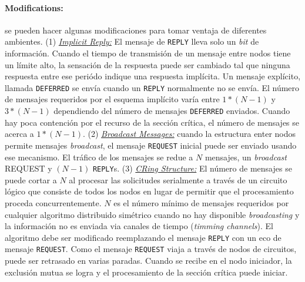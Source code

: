 \paragraph{\textnormal{\textbf{Modifications:}}}
se pueden hacer algunas modificaciones para tomar ventaja de diferentes ambientes. (1) \underline{\emph{Implicit Reply:}} El mensaje de \texttt{REPLY} lleva solo un \emph{bit} de información. Cuando el tiempo de transmisión de un mensaje entre nodos tiene un límite alto, la sensación de la respuesta puede ser cambiado tal que ninguna respuesta entre ese periódo indique una respuesta implícita. Un mensaje explícito, llamada \texttt{DEFERRED} se envía cuando un \texttt{REPLY} normalmente no se envía. El número de mensajes requeridos por el esquema implícito varía entre $1 * (N - 1)$ y $3 * (N - 1)$ dependiendo del número de mensajes \texttt{DEFERRED} enviados. Cuando hay poca contención por el recurso de la sección crítica, el número de mensajes se acerca a $1 * (N - 1)$. (2) \underline{\emph{Broadcast Messages:}} cuando la estructura enter nodos permite mensajes \emph{broadcast}, el mensaje \texttt{REQUEST} inicial puede ser enviado usando ese mecanismo. El tráfico de los mensajes se redue a $N$ mensajes, un \emph{broadcast} REQUEST y $(N - 1)$ \texttt{REPLY}s. (3) \underline{\emph{CRing Structure:}} El número de mensajes se puede cortar a $N$ al procesar las solicitudes serialmente a través de un circuito lógico que consiste de todos los nodos en lugar de permitir que el procesamiento proceda concurrentemente. $N$ es el número mínimo de mensajes requeridos por cualquier algoritmo distribuido simétrico cuando no hay disponible \emph{broadcasting} y la información no es enviada via canales de tiempo (\emph{timming channels}). El algoritmo debe ser modificado reemplazando el mensaje \texttt{REPLY} con un eco de mensaje \texttt{REQUEST}. Como el mensaje \texttt{REQUEST} viaja a través de nodos de circuitos, puede ser retrasado en varias paradas. Cuando se recibe en el nodo iniciador, la exclusión mutua se logra y el procesamiento de la sección crítica puede iniciar.

